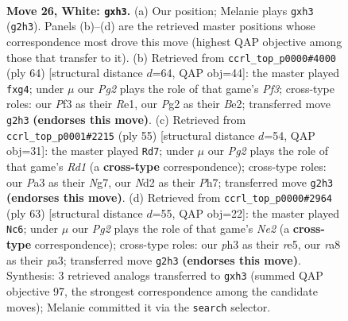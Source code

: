 \documentclass[11pt]{article}
\begin{document}
\clearpage

\begin{figure}[p]\centering
\begin{subfigure}{0.46\textwidth}\centering
\resizebox{\linewidth}{!}{%
\newchessgame
\chessboard[
  setfen={r5kr/8/8/3p2p1/p2n4/P4P1p/3N2PP/R4RK1 w - - 0 26},
  showmover=false,
  pgfstyle=straightmove, color=movearrow, markmove={g2-h3}
]}
\caption{}
\end{subfigure}\hfill
\begin{subfigure}{0.46\textwidth}\centering
\resizebox{\linewidth}{!}{%
\newchessgame
\chessboard[
  setfen={5rk1/3p3p/8/2rP4/p4np1/P4P2/1P2B2P/4RRK1 w - - 1 33},
  showmover=false,
  pgfstyle=straightmove, color=movearrow, markmove={f3-g4}
]}
\caption{}
\end{subfigure}
\\[4pt]
\begin{subfigure}{0.46\textwidth}\centering
\resizebox{\linewidth}{!}{%
\newchessgame
\chessboard[
  setfen={3r1rk1/6np/4p3/p4p2/4p3/P1P1R3/2KN1PPP/4R3 b - - 1 28},
  showmover=false,
  pgfstyle=straightmove, color=movearrow, markmove={d8-d7}
]}
\caption{}
\end{subfigure}\hfill
\begin{subfigure}{0.46\textwidth}\centering
\resizebox{\linewidth}{!}{%
\newchessgame
\chessboard[
  setfen={r4rk1/p3npp1/1p1N3p/4R3/1P3P2/P7/6PP/3R2K1 b - - 2 32},
  showmover=false,
  pgfstyle=straightmove, color=movearrow, markmove={e7-c6}
]}
\caption{}
\end{subfigure}
\caption{\textbf{Move 26, White: \texttt{gxh3}.} (a) Our position; Melanie plays \texttt{gxh3} (\texttt{g2h3}). Panels (b)--(d) are the retrieved master positions whose correspondence most drove this move (highest QAP objective among those that transfer to it). (b) Retrieved from \texttt{ccrl\_top\_p0000\#4000} (ply 64) [structural distance $d$=64, QAP obj=44]: the master played \texttt{fxg4}; under $\mu$ our \emph{Pg2} plays the role of that game's \emph{Pf3}; cross-type roles: our \emph{P}f3 as their \emph{R}e1, our \emph{P}g2 as their \emph{B}e2; transferred move \texttt{g2h3} \textbf{(endorses this move)}. (c) Retrieved from \texttt{ccrl\_top\_p0001\#2215} (ply 55) [structural distance $d$=54, QAP obj=31]: the master played \texttt{Rd7}; under $\mu$ our \emph{Pg2} plays the role of that game's \emph{Rd1} (a \textbf{cross-type} correspondence); cross-type roles: our \emph{P}a3 as their \emph{N}g7, our \emph{N}d2 as their \emph{P}h7; transferred move \texttt{g2h3} \textbf{(endorses this move)}. (d) Retrieved from \texttt{ccrl\_top\_p0000\#2964} (ply 63) [structural distance $d$=55, QAP obj=22]: the master played \texttt{Nc6}; under $\mu$ our \emph{Pg2} plays the role of that game's \emph{Ne2} (a \textbf{cross-type} correspondence); cross-type roles: our \emph{p}h3 as their \emph{r}e5, our \emph{r}a8 as their \emph{p}a3; transferred move \texttt{g2h3} \textbf{(endorses this move)}. Synthesis: 3 retrieved analogs transferred to \texttt{gxh3} (summed QAP objective 97, the strongest correspondence among the candidate moves); Melanie committed it via the \texttt{search} selector.}
\label{fig:thought-m50}
\end{figure}
\end{document}
